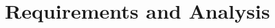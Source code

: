 \documentclass[Dissertation.tex]{subfiles}
\begin{document}
\chapter{Requirements and Analysis}
\end{document}
